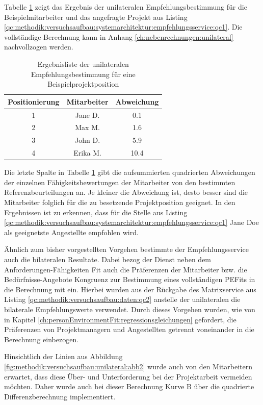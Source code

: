 Tabelle \ref{tbl:methodik:versuchsaufbau:unilateral:tbl2} zeigt das Ergebnis der unilateralen Empfehlungsbestimmung für die Beispielmitarbeiter und das angefragte Projekt aus Listing \ref{qc:methodik:versuchsaufbau:systemarchitektur:empfehlungsservice:qc1}. Die vollständige Berechnung kann in Anhang \ref{ch:nebenrechnungen:unilateral} nachvollzogen werden.

\begin{table}[h]
	\centering
	\begin{tabular}{c|c|c}
		\textbf{Positionierung} & \textbf{Mitarbeiter} & \textbf{Abweichung}\\
		\hline
		1 & Jane D.  & 0.1\\
		2 & Max M.   & 1.6\\
		3 & John D.  & 5.9\\
		4 & Erika M. & 10.4
	\end{tabular}
	\caption{Ergebnisliste der unilateralen Empfehlungsbestimmung für eine Beispielprojektposition}
	\label{tbl:methodik:versuchsaufbau:unilateral:tbl2}
\end{table}

Die letzte Spalte in Tabelle \ref{tbl:methodik:versuchsaufbau:unilateral:tbl2} gibt die aufsummierten quadrierten Abweichungen der einzelnen Fähigkeitsbewertungen der Mitarbeiter von den bestimmten Referenzbeurteilungen an. Je kleiner die Abweichung ist, desto besser sind die Mitarbeiter folglich für die zu besetzende Projektposition geeignet. In den Ergebnissen ist zu erkennen, dass für die Stelle aus Listing \ref{qc:methodik:versuchsaufbau:systemarchitektur:empfehlungsservice:qc1} Jane Doe als geeignetste Angestellte empfohlen wird.

Ähnlich zum bisher vorgestellten Vorgehen bestimmte der Empfehlungsservice auch die bilateralen Resultate. Dabei bezog der Dienst neben dem Anforderungen-Fähigkeiten Fit auch die Präferenzen der Mitarbeiter bzw. die Bedürfnisse-Angebote Kongruenz zur Bestimmung eines vollständigen \acp{PEFit} in die Berechnung mit ein. Hierbei wurden aus der Rückgabe des Matrixservice aus Listing \ref{qc:methodik:versuchsaufbau:daten:qc2} anstelle der unilateralen die bilaterale Empfehlungswerte verwendet. Durch dieses Vorgehen wurden, wie von \textcite[S. 51ff.]{edwards:1991} in Kapitel \ref{ch:personEnvironmentFit:regressionsgleichungen} gefordert, die Präferenzen von Projektmanagern und Angestellten getrennt voneinander in die Berechnung einbezogen.

Hinsichtlich der Linien aus Abbildung \ref{fig:methodik:versuchsaufbau:unilateral:abb2} wurde auch von den Mitarbeitern erwartet, dass diese Über- und Unterforderung bei der Projektarbeit vermeiden möchten. Daher wurde auch bei dieser Berechnung Kurve B über die quadrierte Differenzberechnung implementiert.

